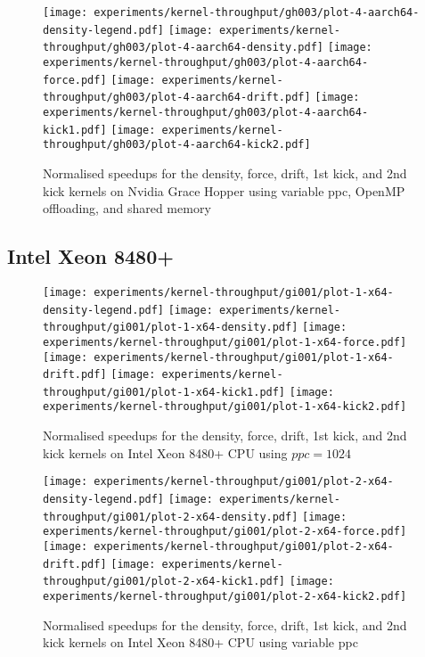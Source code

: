 \begin{figure}[H]
\centering
 \texttt{[image: experiments/kernel-throughput/gh003/plot-4-aarch64-density-legend.pdf]}
 \texttt{[image: experiments/kernel-throughput/gh003/plot-4-aarch64-density.pdf]}
 \texttt{[image: experiments/kernel-throughput/gh003/plot-4-aarch64-force.pdf]}
 \texttt{[image: experiments/kernel-throughput/gh003/plot-4-aarch64-drift.pdf]}
 \texttt{[image: experiments/kernel-throughput/gh003/plot-4-aarch64-kick1.pdf]}
 \texttt{[image: experiments/kernel-throughput/gh003/plot-4-aarch64-kick2.pdf]}
\caption{Normalised speedups for the density, force, drift, 1st kick, and 2nd kick kernels on Nvidia Grace Hopper using variable ppc, OpenMP offloading, and shared memory}
\end{figure}

\subsection{Intel Xeon 8480+}

\begin{figure}[H]
\centering
 \texttt{[image: experiments/kernel-throughput/gi001/plot-1-x64-density-legend.pdf]}
 \texttt{[image: experiments/kernel-throughput/gi001/plot-1-x64-density.pdf]}
 \texttt{[image: experiments/kernel-throughput/gi001/plot-1-x64-force.pdf]}
 \texttt{[image: experiments/kernel-throughput/gi001/plot-1-x64-drift.pdf]}
 \texttt{[image: experiments/kernel-throughput/gi001/plot-1-x64-kick1.pdf]}
 \texttt{[image: experiments/kernel-throughput/gi001/plot-1-x64-kick2.pdf]}
\caption{Normalised speedups for the density, force, drift, 1st kick, and 2nd kick kernels on Intel Xeon 8480+ CPU using $ppc=1024$}
\end{figure}

\begin{figure}[H]
\centering
 \texttt{[image: experiments/kernel-throughput/gi001/plot-2-x64-density-legend.pdf]}
 \texttt{[image: experiments/kernel-throughput/gi001/plot-2-x64-density.pdf]}
 \texttt{[image: experiments/kernel-throughput/gi001/plot-2-x64-force.pdf]}
 \texttt{[image: experiments/kernel-throughput/gi001/plot-2-x64-drift.pdf]}
 \texttt{[image: experiments/kernel-throughput/gi001/plot-2-x64-kick1.pdf]}
 \texttt{[image: experiments/kernel-throughput/gi001/plot-2-x64-kick2.pdf]}
\caption{Normalised speedups for the density, force, drift, 1st kick, and 2nd kick kernels on Intel Xeon 8480+ CPU using variable ppc}
\end{figure}